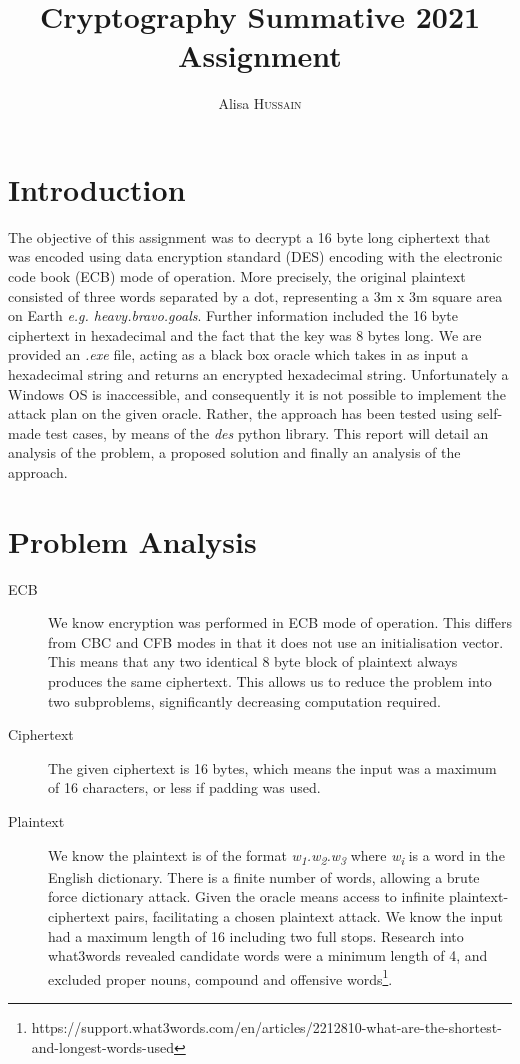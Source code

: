 \documentclass{article}[]
\title{Cryptography Summative 2021 Assignment} %
\author{Alisa \textsc{Hussain}} %
\date{\displaydate{date}}
\begin{document}
	
	\maketitle %
	\section{Introduction}
	The objective of this assignment was to decrypt a 16 byte long ciphertext that was encoded using data encryption standard (DES) encoding with the electronic code book (ECB) mode of operation. More precisely, the original plaintext consisted of three words separated by a dot, representing a 3m x 3m square area on Earth \textit{e.g. heavy.bravo.goals}. Further information included the 16 byte ciphertext in hexadecimal and the fact that the key was 8 bytes long. We are provided an \textit{.exe} file, acting as a black box oracle which takes in as input a hexadecimal string and returns an encrypted hexadecimal string. Unfortunately a Windows OS is inaccessible, and consequently it is not possible to implement the attack plan on the given oracle. Rather, the approach has been tested using self-made test cases, by means of the \textit{des} python library. This report will detail an analysis of the problem, a proposed solution and finally an analysis of the approach.
	
	\section{ Problem Analysis}
	\begin{description}
		\item[ECB]
		We know encryption was performed in ECB mode of operation. This differs from CBC and CFB modes in that it does not use an initialisation vector. This means that any two identical 8 byte block of plaintext always produces the same ciphertext. This allows us to reduce the problem into two subproblems, significantly decreasing computation required.
		\item[Ciphertext]
		The given ciphertext is 16 bytes, which means the input was a maximum of 16 characters, or less if padding was used.
		\item[Plaintext]
		We know the plaintext is of the format \textit{w\textsubscript{1}.w\textsubscript{2}.w\textsubscript{3}} where \textit{w\textsubscript{i}} is a word in the English dictionary. There is a finite number of words, allowing a brute force dictionary attack. Given the oracle means access to infinite plaintext-ciphertext pairs, facilitating a chosen plaintext attack. We know the input had a maximum length of 16 including two full stops. Research into what3words revealed candidate words were a minimum length of 4, and excluded proper nouns, compound and offensive words\footnote{\label{note1}https://support.what3words.com/en/articles/2212810-what-are-the-shortest-and-longest-words-used}.
	\end{description}
	
\end{document}
